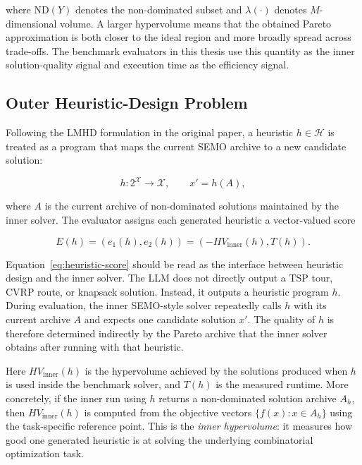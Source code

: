 where $\mathrm{ND}(Y)$ denotes the non-dominated subset and $\lambda(\cdot)$ denotes $M$-dimensional volume. A larger hypervolume means that the obtained Pareto approximation is both closer to the ideal region and more broadly spread across trade-offs. The benchmark evaluators in this thesis use this quantity as the inner solution-quality signal and execution time as the efficiency signal.

\subsection{Outer Heuristic-Design Problem}

Following the LMHD formulation in the original \mpage{} paper, a heuristic $h \in \mathcal{H}$ is treated as a program that maps the current SEMO archive to a new candidate solution:

\begin{equation}
  h : 2^{\mathcal{X}} \rightarrow \mathcal{X}, \qquad x' = h(A),
\end{equation}

where $A$ is the current archive of non-dominated solutions maintained by the inner solver. The evaluator assigns each generated heuristic a vector-valued score

\begin{equation}
  E(h) = \left(e_1(h), e_2(h)\right)
       = \left(-HV_{\text{inner}}(h), T(h)\right).
  \label{eq:heuristic-score}
\end{equation}

Equation~\ref{eq:heuristic-score} should be read as the interface between heuristic design and the inner solver. The LLM does not directly output a TSP tour, CVRP route, or knapsack solution. Instead, it outputs a heuristic program $h$. During evaluation, the inner SEMO-style solver repeatedly calls $h$ with its current archive $A$ and expects one candidate solution $x'$. The quality of $h$ is therefore determined indirectly by the Pareto archive that the inner solver obtains after running with that heuristic.

Here $HV_{\text{inner}}(h)$ is the hypervolume achieved by the solutions produced when $h$ is used inside the benchmark solver, and $T(h)$ is the measured runtime. More concretely, if the inner run using $h$ returns a non-dominated solution archive $A_h$, then $HV_{\text{inner}}(h)$ is computed from the objective vectors $\{f(x):x\in A_h\}$ using the task-specific reference point. This is the \emph{inner hypervolume}: it measures how good one generated heuristic is at solving the underlying combinatorial optimization task.

